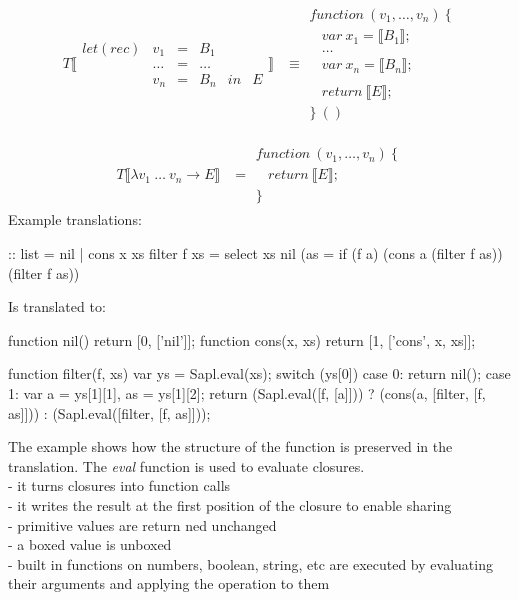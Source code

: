 \begin{align*}
T\llbracket \begin{array}{cccccc}
let(rec) & v_1    & = & B_1    &    & \\
         & \ldots & = & \ldots &    & \\
         & v_n    & = & B_n    & in & E
\end{array} \rrbracket &\equiv \begin{array}{l}
function\ (v_1, \ldots, v_n)\ \{ \\
\ \ \ \ var\ x_1 = \llbracket B_1 \rrbracket; \\
\ \ \ \ \ldots \\
\ \ \ \ var\ x_n = \llbracket B_n \rrbracket; \\
\\
\ \ \ \ return\ \llbracket E \rrbracket; \\
\}\ ()
\end{array}
\end{align*}

\begin{align*}
T\llbracket \lambda v_1 \: \ldots \: v_n \rightarrow E \rrbracket &= \begin{array}{l}
function\ (v_1, \ldots, v_n)\ \{ \\
\ \ \ \ return\ \llbracket E \rrbracket; \\
\}
\end{array}
\end{align*}
%
Example translations:
\begin{CleanCode}
:: list = nil | cons x xs	
filter f xs = select xs nil (\a as = if (f a) (cons a (filter f as)) (filter f as))
\end{CleanCode}
%
Is translated to:
\begin{CleanCode}
function nil() {return [0, ['nil']];}
function cons(x, xs) {return [1, ['cons', x, xs]];}

function filter(f, xs) {
    var ys = Sapl.eval(xs);
    switch (ys[0]) {
    case 0:
        return nil();
    case 1:
        var a = ys[1][1],
            as = ys[1][2];
        return (Sapl.eval([f, [a]])) ? (cons(a, [filter, [f, as]])) : 
                                       (Sapl.eval([filter, [f, as]]));
    }
}\end{CleanCode}
The example shows how the structure of the function is preserved in the translation.
The \emph{eval} function is used to evaluate closures.\\
- it turns closures into function calls\\
- it writes the result at the first position of the closure to enable sharing\\
- primitive values are return ned unchanged\\
- a boxed value is unboxed\\
- built in functions on numbers, boolean, string, etc are executed by evaluating their arguments and applying the operation to them

